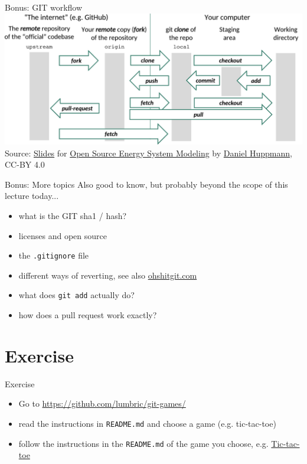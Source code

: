 \begin{frame}[fragile]{Bonus: GIT workflow}
    \includegraphics[width=\textwidth]{images/git-workflow.pdf}
    \pause
    \vfill
    {\tiny Source:
    \href{https://data.ene.iiasa.ac.at/teaching/_static/osesm_summer2019/Lecture_1.pdf}{Slides} for
    \href{https://data.ene.iiasa.ac.at/teaching/#tu-vienna-summer-semester-2019-370-062}{Open Source Energy System Modeling}
    by \href{github.com/danielhuppmann}{Daniel Huppmann}, CC-BY 4.0
    }
\end{frame}


\begin{frame}[fragile]{Bonus: More topics}
    Also good to know, but probably beyond the scope of this lecture today...
    \begin{itemize}
        \item what is the GIT sha1 / hash?
        \item licenses and open source
        \item the \verb|.gitignore| file
        \item different ways of reverting, see also \href{https://ohshitgit.com/}{ohshitgit.com}
        \item what does \verb|git add| actually do?
        \item how does a pull request work exactly?
    \end{itemize}
\end{frame}


\section{Exercise}

\begin{frame}[fragile]{Exercise}
    \begin{itemize}
        \item Go to \href{https://github.com/lumbric/git-games/}{https://github.com/lumbric/git-games/}
        \item read the instructions in \verb|README.md| and choose a game (e.g. tic-tac-toe)
        \item follow the instructions in the \verb|README.md| of the game you choose, e.g.
            \href{https://github.com/lumbric/git-games/tree/master/tic-tac-toe#how-to-play}{Tic-tac-toe}

    \end{itemize}
\end{frame}


